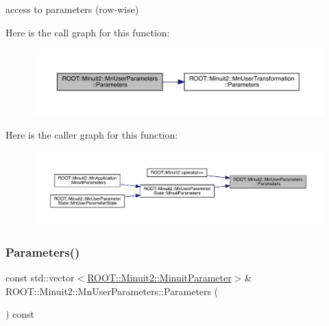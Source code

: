 access to parameters (row-\/wise) 

Here is the call graph for this function\+:\nopagebreak
\begin{figure}[H]
\begin{center}
\leavevmode
\includegraphics[width=350pt]{d6/d10/classROOT_1_1Minuit2_1_1MnUserParameters_a6b6a4cf33fb9e482a193db522763cd76_cgraph}
\end{center}
\end{figure}
Here is the caller graph for this function\+:\nopagebreak
\begin{figure}[H]
\begin{center}
\leavevmode
\includegraphics[width=350pt]{d6/d10/classROOT_1_1Minuit2_1_1MnUserParameters_a6b6a4cf33fb9e482a193db522763cd76_icgraph}
\end{center}
\end{figure}
\mbox{\label{classROOT_1_1Minuit2_1_1MnUserParameters_a0ca783762d29fc6e9fa2c7b162f044f4}} 
\subsubsection{\texorpdfstring{Parameters()}{Parameters()}\hspace{0.1cm}{\footnotesize\ttfamily [2/2]}}
{\footnotesize\ttfamily const std\+::vector$<$\mbox{\hyperlink{classROOT_1_1Minuit2_1_1MinuitParameter}{R\+O\+O\+T\+::\+Minuit2\+::\+Minuit\+Parameter}}$>$\& R\+O\+O\+T\+::\+Minuit2\+::\+Mn\+User\+Parameters\+::\+Parameters (\begin{DoxyParamCaption}{ }\end{DoxyParamCaption}) const}



